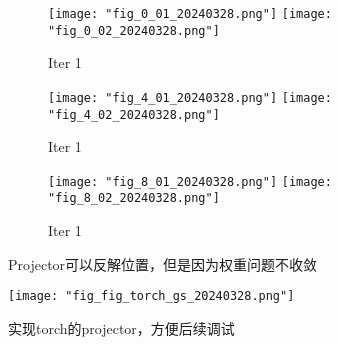 \begin{figure}
    \begin{subfigure}{0.8\linewidth}
        \texttt{[image: "fig\_0\_01\_20240328.png"]}
        \texttt{[image: "fig\_0\_02\_20240328.png"]}
        \caption{Iter 1}
    \end{subfigure}
    \begin{subfigure}{0.8\linewidth}
        \texttt{[image: "fig\_4\_01\_20240328.png"]}
        \texttt{[image: "fig\_4\_02\_20240328.png"]}
        \caption{Iter 1}
    \end{subfigure}
    \begin{subfigure}{0.8\linewidth}
        \texttt{[image: "fig\_8\_01\_20240328.png"]}
        \texttt{[image: "fig\_8\_02\_20240328.png"]}
        \caption{Iter 1}
    \end{subfigure}
    \caption{Projector可以反解位置，但是因为权重问题不收敛}
\end{figure}

\begin{figure}
    \texttt{[image: "fig\_fig\_torch\_gs\_20240328.png"]}
    \caption{实现torch的projector，方便后续调试}
\end{figure}
